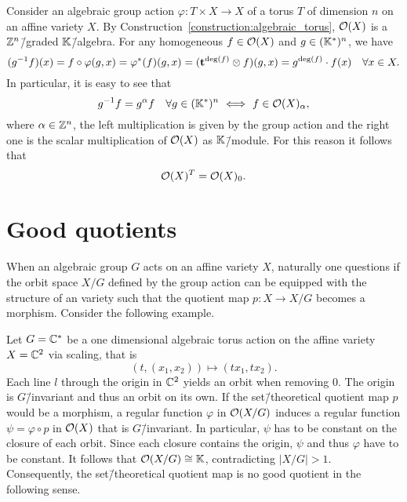 \begin{ex}
	\label{example:regular_functions_torus_group_action}
	Consider an algebraic group action $\varphi\colon T \times X \rightarrow X$ of a torus $T$ of dimension $n$ on an affine variety $X$. By Construction~\ref{construction:algebraic_torus}, $\mathcal{O}(X)$ is a $\mathbb{Z}^n$\=/graded $\mathbb{K}$\=/algebra. For any homogeneous $f\in\mathcal{O}(X)$ and $g\in (\mathbb{K}^*)^n$, we have
	$$(g^{-1}f)(x) = f \circ \varphi(g,x) = \varphi^*(f)(g,x) = (\mathbf{t}^{\deg(f)} \otimes f)(g,x) = g^{\deg(f)}\cdot f(x)\quad \forall x\in X.$$
	In particular, it is easy to see that
	$$g^{-1}f = g^\alpha f\quad \forall g\in (\field^*)^n \ \Longleftrightarrow \ f\in\O(X)_\alpha,$$
	where $\alpha\in\mathbb{Z}^n$, the left multiplication is given by the group action and the right one is the scalar multiplication of $\mathcal{O}(X)$ as $\mathbb{K}$\=/module.
	For this reason it follows that
	$$ \mathcal{O}(X)^T = \mathcal{O}(X)_0.$$
\end{ex}

\section{Good quotients}
When an algebraic group $G$ acts on an affine variety $X$, naturally one questions if the orbit space $X/G$ defined by the group action can be equipped with the structure of an variety such that the quotient map $p\colon X\rightarrow X/G$ becomes a morphism. Consider the following example.

\begin{ex}
	\label{example:bad_quotient}
	Let $G=\mathbb{C}^*$ be a one dimensional algebraic torus action on the affine variety $X = \mathbb{C}^2$ via scaling, that is
	$$(t,(x_1,x_2)) \mapsto (tx_1,tx_2).$$
	Each line $l$ through the origin in $\mathbb{C}^2$ yields an orbit when removing 0. The origin is $G$\=/invariant and thus an orbit on its own.
	If the set\=/theoretical quotient map $p$ would be a morphism, a regular function $\varphi$ in $\mathcal{O}(X/G)$ induces a regular function $\psi = \varphi \circ p$ in $\mathcal{O}(X)$ that is $G$\=/invariant. In particular, $\psi$ has to be constant on the closure of each orbit. Since each closure contains the origin, $\psi$ and thus $\varphi$ have to be constant. It follows that $\mathcal{O}(X/G) \cong \mathbb{K}$, contradicting $|X/G| > 1$. Consequently, the set\=/theoretical quotient map is no good quotient in the following sense.
\end{ex}

